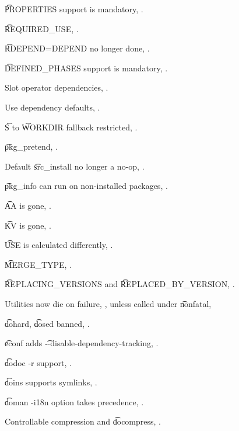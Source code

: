 \begin{compactitem}
\item \t{PROPERTIES} support is mandatory, .
\item \t{REQUIRED\_USE}, .
\item \t{RDEPEND=DEPEND} no longer done, .
\item \t{DEFINED\_PHASES} support is mandatory, .
\item Slot operator dependencies, .
\item Use dependency defaults, .
\item \t{S} to \t{WORKDIR} fallback restricted, .
\item \t{pkg\_pretend}, .
\item Default \t{src\_install} no longer a no-op, .
\item \t{pkg\_info} can run on non-installed packages, .
\item \t{AA} is gone, .
\item \t{KV} is gone, .
\item \t{USE} is calculated differently, .
\item \t{MERGE\_TYPE}, .
\item \t{REPLACING\_VERSIONS} and \t{REPLACED\_BY\_VERSION}, .
\item Utilities now die on failure, , unless called under \t{nonfatal},
\item \t{dohard}, \t{dosed} banned, .
\item \t{econf} adds \t{-{}-disable-dependency-tracking}, .
\item \t{dodoc -r} support, .
\item \t{doins} supports symlinks, .
\item \t{doman -i18n} option takes precedence, .
\item Controllable compression and \t{docompress}, .
\end{compactitem}


